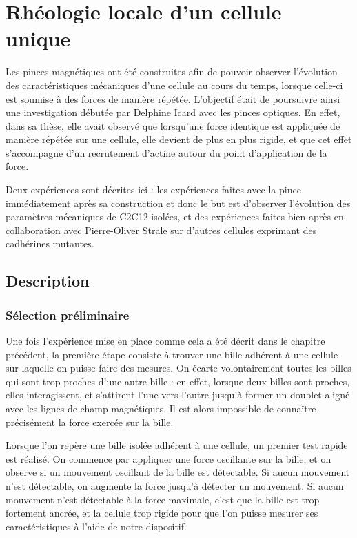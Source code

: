 \documentclass{report}
\begin{document}
\chapter{Rhéologie locale d'un cellule unique}

Les pinces magnétiques ont été construites afin de pouvoir observer l'évolution des caractéristiques mécaniques d'une cellule au cours du temps, lorsque celle-ci est soumise à des forces de manière répétée. L'objectif était de poursuivre ainsi une investigation débutée par Delphine Icard avec les pinces optiques. En effet, dans sa thèse, elle avait observé que lorsqu'une force identique est appliquée de manière répétée sur une cellule, elle devient de plus en plus rigide, et que cet effet s'accompagne d'un recrutement d'actine autour du point d'application de la force. 

Deux expériences sont décrites ici : les expériences faites avec la pince immédiatement après sa construction et donc le but est d'observer l'évolution des paramètres mécaniques de C2C12 isolées, et des expériences faites bien après en collaboration avec Pierre-Oliver Strale sur d'autres cellules exprimant des cadhérines mutantes. 

\section{Description}

\subsection{Sélection préliminaire}

Une fois l'expérience mise en place comme cela a été décrit dans le chapitre précédent, la première étape consiste à trouver une bille adhérent à une cellule sur laquelle on puisse faire des mesures. 
On écarte volontairement toutes les billes qui sont trop proches d'une autre bille : en effet, lorsque deux billes sont proches, elles interagissent, et s'attirent l'une vers l'autre jusqu'à former un doublet aligné avec les lignes de champ magnétiques. Il est alors impossible de connaître précisément la force exercée sur la bille. 

Lorsque l'on repère une bille isolée adhérent à une cellule, un premier test rapide est réalisé.
On commence par appliquer une force oscillante sur la bille, et on observe si un mouvement oscillant de la bille est détectable. Si aucun mouvement n'est détectable, on augmente la force jusqu'à détecter un mouvement. Si aucun mouvement n'est détectable à la force maximale, c'est que la bille est trop fortement ancrée, et la cellule trop rigide pour que l'on puisse mesurer ses caractéristiques à l'aide de notre dispositif. 
\end{document}
